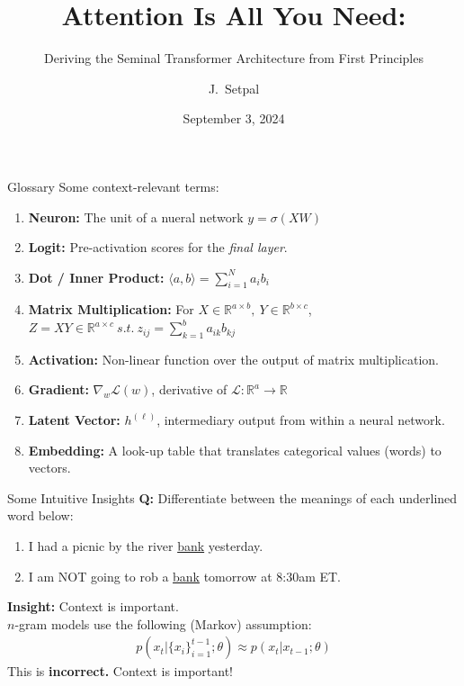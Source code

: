 \documentclass{beamer}
\title[The Transformer Architecture]{Attention Is All You Need:}
\subtitle{Deriving the Seminal Transformer Architecture from First Principles}
\author[Machine Learning @ Purdue] %
{J.~Setpal}
\date{September 3, 2024}
\begin{document}
\frame{\titlepage}



\begin{frame}{Glossary}
	Some context-relevant terms:
	\begin{enumerate}[label=\alph*.]
		\item \textbf{Neuron:} The unit of a nueral network $y = \sigma(XW)$ \pause
		\item \textbf{Logit:} Pre-activation scores for the \textit{final layer}. \pause 
		\item \textbf{Dot / Inner Product:} $\langle a, b \rangle = \sum^N_{i=1}a_ib_i $ \pause 
		\item \textbf{Matrix Multiplication:} For $X \in \mathbb{R}^{a \times b},\ Y \in \mathbb{R}^{b \times c}$, $Z = XY \in \mathbb{R}^{a \times c}\ s.t.\ z_{ij} = \sum^b_{k=1} a_{ik} b_{kj}$ \pause 
		\item \textbf{Activation:} Non-linear function over the output of matrix multiplication. \pause 
		\item \textbf{Gradient:} $\nabla_w \mathcal{L}(w)$, derivative of $\mathcal{L}: \mathbb{R}^a \rightarrow \mathbb{R}$ \pause 
		\item \textbf{Latent Vector:} $h^{(\ell)}$, intermediary output from within a neural network. \pause 
		\item \textbf{Embedding:} A look-up table that translates categorical values (words) to vectors.
	\end{enumerate}
\end{frame}

\begin{frame}{Some Intuitive Insights}
	\textbf{Q:} Differentiate between the meanings of each underlined word below:
	\begin{enumerate}[label=\alph*.]
		\item I had a picnic by the river \underline{bank} yesterday.
		\item I am NOT going to rob a \underline{bank} tomorrow at 8:30am ET.
	\end{enumerate} \pause

	\textbf{Insight:} Context is important. \pause \newline \\

	$n$-gram models use the following (Markov) assumption:
	\begin{gather}
	p\left(x_t | \{x_i\}^{t-1}_{i=1};\theta\right) \approx p\left(x_t | x_{t-1};\theta\right)
	\end{gather} \pause \vspace{-1.5em}
	This is \textbf{incorrect.} \pause Context is important!
\end{frame}
\end{document}
